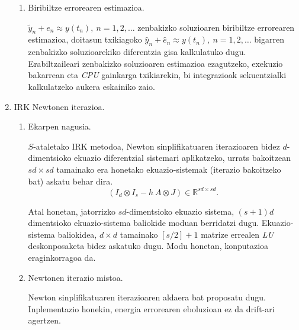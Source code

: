 \begin{enumerate}
\begin{enumerate}
\item Biribiltze errorearen estimazioa.

$\tilde{y}_n+e_n \approx y(t_n), \ n=1,2,\dots$ zenbakizko soluzioaren  biribiltze errorearen estimazioa, doitasun txikiagoko $\hat{y}_n+\hat{e}_n \approx y(t_n), \ n=1,2,\dots$ bigarren zenbakizko soluzioarekiko  diferentzia gisa kalkulatuko dugu.
Erabiltzaileari zenbakizko soluzioaren estimazioa ezagutzeko, exekuzio bakarrean  eta \emph{CPU} gainkarga txikiarekin, bi integrazioak sekuentzialki kalkulatzeko aukera eskainiko zaio. 

\end{enumerate}


\item IRK Newtonen iterazioa.

\begin{enumerate}
\item Ekarpen nagusia.

$S$-ataletako IRK metodoa,  Newton sinplifikatuaren iterazioaren bidez $d$-dimentsioko ekuazio diferentzial  sistemari aplikatzeko, urrats bakoitzean $sd \times sd$ tamainako era honetako ekuazio-sistemak (iterazio bakoitzeko bat) askatu behar dira.
\begin{equation*}
(I_d \otimes I_s- h \ A \otimes J) \in \mathbb{R}^{sd \times sd}.
\end{equation*} 

Atal honetan, jatorrizko $sd$-dimentsioko ekuazio sistema, $(s+1)d$ dimentsioko ekuazio-sistema baliokide moduan berridatzi dugu. Ekuazio-sistema baliokidea,  $d \times d$ tamainako $[s/2]+1$ matrize errealen \emph{LU} deskonposaketa bidez askatuko dugu. Modu honetan, konputazioa eraginkorragoa da.



\item Newtonen iterazio mistoa.

Newton sinplifikatuaren iterazioaren aldaera bat proposatu dugu. Inplementazio honekin, energia errorearen eboluzioan ez da drift-ari agertzen. 




\end{enumerate}
  


\end{enumerate}
